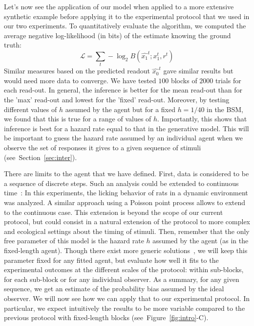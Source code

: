 \documentclass[12pt,english]{article}%
\newcommand{\eql}[1]{\begin{equation}#1\end{equation}}
\newcommand{\Ll}{\mathcal{L}}
\newcommand{\citep}[1]{\parencite{#1}}
\newcommand{\seeFig}[1]{Figure~\ref{fig:#1}}
\newcommand{\seeSec}[1]{Section~\ref{sec:#1}}
\begin{document}
Let's now see the application of our model when applied
to a more extensive synthetic example before applying it to the experimental protocol
that we used in our two experiments.
To quantitatively evaluate the algorithm,
we computed the average negative log-likelihood (in bits) of the estimate
knowing the ground truth:
\eql{
\Ll =  \sum_{t} -\log_2 B(\hat{x_1}^t ; x_1^t, r^t )
}
Similar measures based on the predicted readout $\hat{x_0}^t$
gave similar results but would need more data to converge.
We have tested $100$ blocks of $2000$ trials for each read-out.
In general, the inference is better for the mean read-out
than for the 'max' read-out and lowest for the 'fixed' read-out.
Moreover, by testing different values of $h$ assumed by the agent
but for a fixed $h=1/40$ in the BSM,
we found that this is true for a range of values of $h$.
Importantly, this shows that inference is best for a hazard rate
equal to that in the generative model.
This will be important to guess the hazard rate assumed by an individual agent
when we observe the set of responses it gives to a given sequence of stimuli
(see~\seeSec{inter}).

There are limits to the agent that we have defined.
First, data is considered to be a sequence of discrete steps.
Such an analysis could be extended to continuous time~\citep{RadilloBrady2017}:
In this experiments, the licking behavior of rats in a dynamic environment
was analyzed.
A similar approach using a Poisson point process allows to extend to the continuous case.
This extension is beyond the scope of our current protocol,
but could consist in a natural extension of the protocol
to more complex and ecological settings about the timing of stimuli.
Then, remember that the only free parameter of this model is the hazard rate $h$
assumed by the agent (as in the fixed-length agent).
Though there exist more generic solutions~\citep{Wilson13,Wilson18},
we will keep this parameter fixed for any fitted agent, but evaluate
how well it fits to the experimental outcomes at the different scales of the protocol:
within sub-blocks, for each sub-block or for any individual observer.
As a summary, for any given sequence,
we get an estimate of the probability bias assumed  by the ideal observer.
We will now see how we can apply that to our experimental protocol.
In particular, we expect intuitively the results to be more variable
compared to the previous protocol with fixed-length blocks (see~\seeFig{intro}-C).
\end{document}
